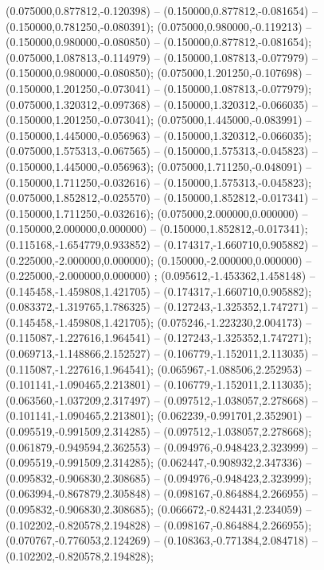  (0.075000,0.877812,-0.120398) -- (0.150000,0.877812,-0.081654) -- (0.150000,0.781250,-0.080391);
 (0.075000,0.980000,-0.119213) -- (0.150000,0.980000,-0.080850) -- (0.150000,0.877812,-0.081654);
 (0.075000,1.087813,-0.114979) -- (0.150000,1.087813,-0.077979) -- (0.150000,0.980000,-0.080850);
 (0.075000,1.201250,-0.107698) -- (0.150000,1.201250,-0.073041) -- (0.150000,1.087813,-0.077979);
 (0.075000,1.320312,-0.097368) -- (0.150000,1.320312,-0.066035) -- (0.150000,1.201250,-0.073041);
 (0.075000,1.445000,-0.083991) -- (0.150000,1.445000,-0.056963) -- (0.150000,1.320312,-0.066035);
 (0.075000,1.575313,-0.067565) -- (0.150000,1.575313,-0.045823) -- (0.150000,1.445000,-0.056963);
 (0.075000,1.711250,-0.048091) -- (0.150000,1.711250,-0.032616) -- (0.150000,1.575313,-0.045823);
 (0.075000,1.852812,-0.025570) -- (0.150000,1.852812,-0.017341) -- (0.150000,1.711250,-0.032616);
 (0.075000,2.000000,0.000000) -- (0.150000,2.000000,0.000000) -- (0.150000,1.852812,-0.017341);
 (0.115168,-1.654779,0.933852) -- (0.174317,-1.660710,0.905882) -- (0.225000,-2.000000,0.000000);
 (0.150000,-2.000000,0.000000) -- (0.225000,-2.000000,0.000000) ;
 (0.095612,-1.453362,1.458148) -- (0.145458,-1.459808,1.421705) -- (0.174317,-1.660710,0.905882);
 (0.083372,-1.319765,1.786325) -- (0.127243,-1.325352,1.747271) -- (0.145458,-1.459808,1.421705);
 (0.075246,-1.223230,2.004173) -- (0.115087,-1.227616,1.964541) -- (0.127243,-1.325352,1.747271);
 (0.069713,-1.148866,2.152527) -- (0.106779,-1.152011,2.113035) -- (0.115087,-1.227616,1.964541);
 (0.065967,-1.088506,2.252953) -- (0.101141,-1.090465,2.213801) -- (0.106779,-1.152011,2.113035);
 (0.063560,-1.037209,2.317497) -- (0.097512,-1.038057,2.278668) -- (0.101141,-1.090465,2.213801);
 (0.062239,-0.991701,2.352901) -- (0.095519,-0.991509,2.314285) -- (0.097512,-1.038057,2.278668);
 (0.061879,-0.949594,2.362553) -- (0.094976,-0.948423,2.323999) -- (0.095519,-0.991509,2.314285);
 (0.062447,-0.908932,2.347336) -- (0.095832,-0.906830,2.308685) -- (0.094976,-0.948423,2.323999);
 (0.063994,-0.867879,2.305848) -- (0.098167,-0.864884,2.266955) -- (0.095832,-0.906830,2.308685);
 (0.066672,-0.824431,2.234059) -- (0.102202,-0.820578,2.194828) -- (0.098167,-0.864884,2.266955);
 (0.070767,-0.776053,2.124269) -- (0.108363,-0.771384,2.084718) -- (0.102202,-0.820578,2.194828);
